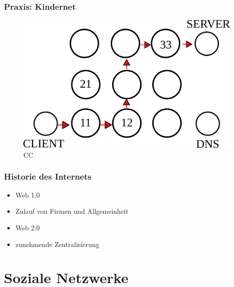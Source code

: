 \documentclass{beamer}
\newcommand{\license}[2][]{\\#2\ifthenelse{\equal{#1}{}}{}{\\\scriptsize\url{#1}}}
\begin{document}
\begin{frame}
  \frametitle{Praxis: Kindernet}
  \begin{figure}
      \includegraphics[height=0.7\textheight]{img/kindernet.png}
      \license{CC}
  \end{figure}
\end{frame}

\begin{frame}
  \frametitle{Historie des Internets}
  \begin{itemize}
    \item<2-> Web 1.0
    \item<3-> Zulauf von Firmen und Allgemeinheit
    \item<4-> Web 2.0
    \item<5-> zunehmende Zentralisierung
  \end{itemize}
\end{frame}

\section{Soziale Netzwerke}
\subsection{}
\end{document}
